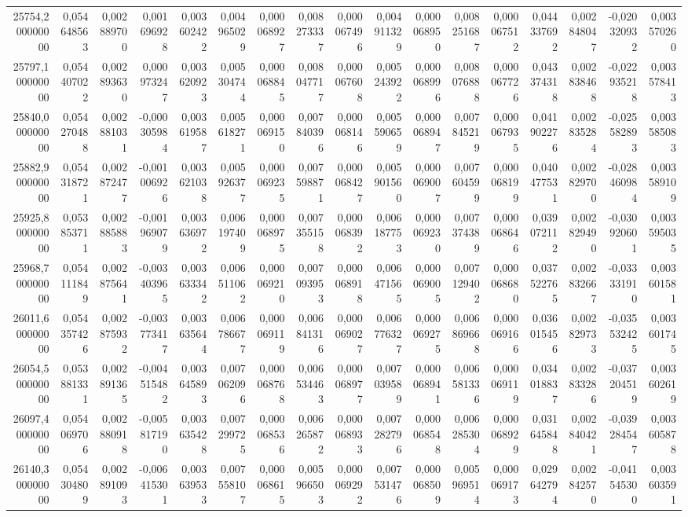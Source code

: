 \begin{longtable}{rrrrrrrrrrrrrrrrr}
25754,200000000 & 0,054648563 & 0,002889700 & 0,001696928 & 0,003602422 & 0,004965029 & 0,000068927 & 0,008273337 & 0,000067496 & 0,004911329 & 0,000068950 & 0,008251687 & 0,000067512 & 0,044337692 & 0,002848047 & -0,020320932 & 0,003570260\\
25797,100000000 & 0,054407022 & 0,002893630 & 0,000973247 & 0,003620923 & 0,005304744 & 0,000068845 & 0,008047717 & 0,000067608 & 0,005243922 & 0,000068996 & 0,008076888 & 0,000067726 & 0,043374318 & 0,002838468 & -0,022935218 & 0,003578413\\
25840,000000000 & 0,054270488 & 0,002881031 & -0,000305984 & 0,003619587 & 0,005618271 & 0,000069150 & 0,007840396 & 0,000068146 & 0,005590659 & 0,000068947 & 0,007845219 & 0,000067935 & 0,041902276 & 0,002835284 & -0,025582893 & 0,003585083\\
25882,900000000 & 0,054318721 & 0,002872477 & -0,001006926 & 0,003621038 & 0,005926377 & 0,000069235 & 0,007598871 & 0,000068427 & 0,005901560 & 0,000069007 & 0,007604599 & 0,000068199 & 0,040477531 & 0,002829700 & -0,028460984 & 0,003589109\\
25925,800000000 & 0,053853711 & 0,002885883 & -0,001969079 & 0,003636972 & 0,006197409 & 0,000068975 & 0,007355158 & 0,000068392 & 0,006187753 & 0,000069230 & 0,007374389 & 0,000068646 & 0,039072112 & 0,002829490 & -0,030920601 & 0,003595035\\
25968,700000000 & 0,054111849 & 0,002875641 & -0,003403965 & 0,003633342 & 0,006511062 & 0,000069210 & 0,007093953 & 0,000068918 & 0,006471565 & 0,000069005 & 0,007129402 & 0,000068680 & 0,037522765 & 0,002832667 & -0,033331910 & 0,003601581\\
26011,600000000 & 0,054357426 & 0,002875932 & -0,003773417 & 0,003635644 & 0,006786677 & 0,000069119 & 0,006841316 & 0,000069027 & 0,006776327 & 0,000069275 & 0,006869668 & 0,000069166 & 0,036015456 & 0,002829733 & -0,035532425 & 0,003601745\\
26054,500000000 & 0,053881331 & 0,002891365 & -0,004515482 & 0,003645893 & 0,007062096 & 0,000068768 & 0,006534463 & 0,000068977 & 0,007039589 & 0,000068941 & 0,006581336 & 0,000069119 & 0,034018837 & 0,002833286 & -0,037204519 & 0,003602619\\
26097,400000000 & 0,054069706 & 0,002880918 & -0,005817190 & 0,003635428 & 0,007299725 & 0,000068536 & 0,006265872 & 0,000068933 & 0,007282796 & 0,000068548 & 0,006285304 & 0,000068929 & 0,031645848 & 0,002840421 & -0,039284547 & 0,003605878\\
26140,300000000 & 0,054304809 & 0,002891093 & -0,006415301 & 0,003639533 & 0,007558107 & 0,000068615 & 0,005966503 & 0,000069292 & 0,007531476 & 0,000068509 & 0,005969514 & 0,000069173 & 0,029642794 & 0,002842570 & -0,041545300 & 0,003603591\\

\end{longtable}
